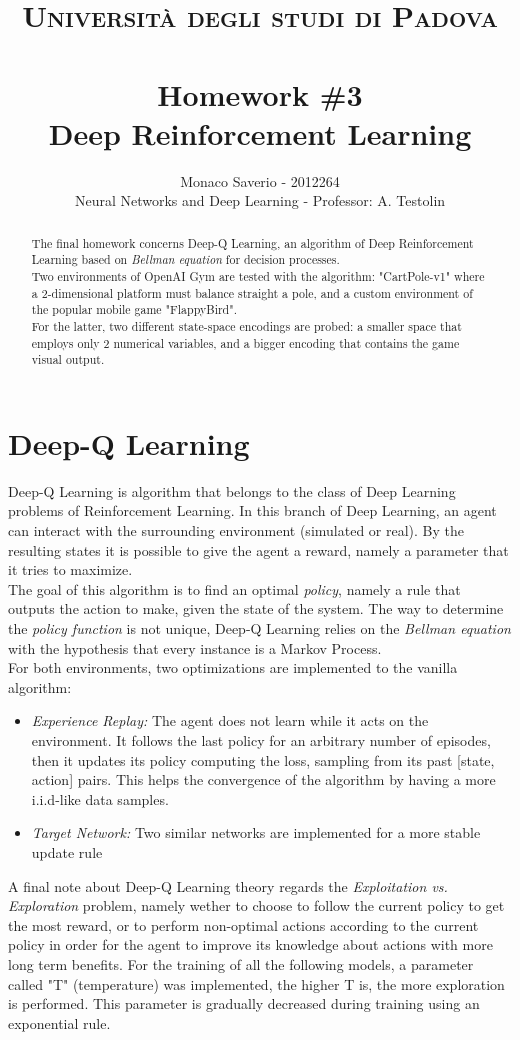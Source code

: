 \documentclass[11pt,a4paper,twocolumn]{IEEEtran}
\author{Monaco Saverio - 2012264 \sepline \\Neural Networks and Deep Learning - Professor: A. Testolin}
\title{{\normalsize\textsc{Università degli studi di Padova}}\vspace{-.5cm} \\ \sepline\\ \textbf{Homework \#3
\\ Deep Reinforcement Learning}}
\begin{document}
	\maketitle
	\begin{abstract} The final homework concerns Deep-Q Learning, an algorithm of Deep Reinforcement Learning based on \textit{Bellman equation} for decision processes.\\
	Two environments of OpenAI Gym are tested with the algorithm: "CartPole-v1" where a 2-dimensional platform must balance straight a pole, and a custom environment of the popular mobile game "FlappyBird".\\
	For the latter, two different state-space encodings are probed: a smaller space that employs only 2 numerical variables, and a bigger encoding that contains the game visual output.
	\end{abstract}
    \section*{\textbf{Deep-Q Learning}}
    Deep-Q Learning is algorithm that belongs to the class of Deep Learning problems of Reinforcement Learning.
    In this branch of Deep Learning, an agent can interact with the surrounding environment (simulated or real). By the resulting states it is possible to give the agent a reward, namely a parameter that it tries to maximize.\\
    The goal of this algorithm is to find an optimal \textit{policy}, namely a rule that outputs the action to make, given the state of the system. The way to determine the \textit{policy function} is not unique, Deep-Q Learning relies on the \textit{Bellman equation} with the hypothesis that every instance is a Markov Process.\medskip\\
    For both environments, two optimizations are implemented to the vanilla algorithm:
    \begin{itemize}
		\item \textit{Experience Replay:} The agent does not learn while it acts on the environment. It follows the last policy for an arbitrary number of episodes, then it updates its policy computing the loss, sampling from its past [state, action] pairs. This helps the convergence of the algorithm by having a more i.i.d-like data samples.
		\item \textit{Target Network:} Two similar networks are implemented for a more stable update rule
	\end{itemize}
	A final note about Deep-Q Learning theory regards the \textit{Exploitation vs. Exploration} problem, namely wether to choose to follow the current policy to get the most reward, or to perform non-optimal actions according to the current policy in order for the agent to improve its knowledge about actions with more long term benefits. For the training of all the following models, a parameter called "T" (temperature) was implemented, the higher T is, the more exploration is performed. This parameter is gradually decreased during training using an exponential rule.
\end{document}
